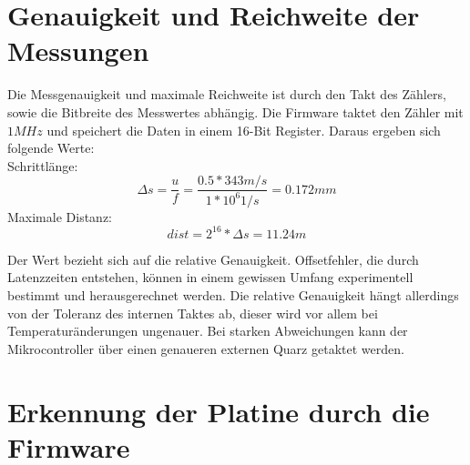 \section{Genauigkeit und Reichweite der Messungen}
Die Messgenauigkeit und maximale Reichweite ist durch den Takt des Zählers, sowie die Bitbreite des Messwertes abhängig. Die Firmware taktet den Zähler mit $1MHz$ und speichert die Daten in einem 16-Bit Register. Daraus ergeben sich folgende Werte:\\
Schrittlänge:
\begin{equation} %
\Delta s = \frac{u}{f} = \frac{0.5 * 343m/s}{1*10^6 1/s} = 0.172 mm
\end{equation}
Maximale Distanz:
\begin{equation}
dist = 2^{16} * \Delta s = 11.24 m
\end{equation}

Der Wert bezieht sich auf die relative Genauigkeit. Offsetfehler, die durch Latenzzeiten entstehen, können in einem gewissen Umfang experimentell bestimmt und herausgerechnet werden. Die relative Genauigkeit hängt allerdings von der Toleranz des internen Taktes ab, dieser wird vor allem bei Temperaturänderungen ungenauer. Bei starken Abweichungen kann der Mikrocontroller über einen genaueren externen Quarz getaktet werden.

\section{Erkennung der Platine durch die Firmware}

